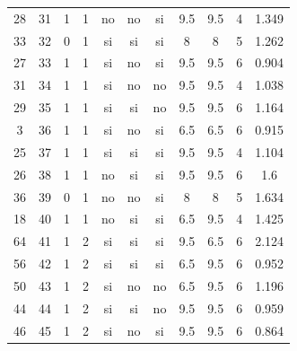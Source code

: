 \documentclass[12pt,a4paper,twoside,openright,titlepage,final]{article}
\begin{document}
\begin{appendices}
\begin{landscape}
\begin{center}
\begin{longtable}{@{\extracolsep{\fill}}*{11}{c}}
							28       & 31           & 1         & 1       & no   & no        & si           & 9.5        & 9.5           & 4             & 1.349  \\
							33       & 32           & 0         & 1       & si   & si        & si           & 8          & 8             & 5             & 1.262  \\
							27       & 33           & 1         & 1       & si   & no        & si           & 9.5        & 9.5           & 6             & 0.904  \\
							31       & 34           & 1         & 1       & si   & no        & no           & 9.5        & 9.5           & 4             & 1.038  \\
							29       & 35           & 1         & 1       & si   & si        & no           & 9.5        & 9.5           & 6             & 1.164  \\
							3        & 36           & 1         & 1       & si   & no        & si           & 6.5        & 6.5           & 6             & 0.915  \\
							25       & 37           & 1         & 1       & si   & si        & si           & 9.5        & 9.5           & 4             & 1.104  \\
							26       & 38           & 1         & 1       & no   & si        & si           & 9.5        & 9.5           & 6             & 1.6    \\
							36       & 39           & 0         & 1       & no   & no        & si           & 8          & 8             & 5             & 1.634  \\
							18       & 40           & 1         & 1       & no   & si        & si           & 6.5        & 9.5           & 4             & 1.425  \\
							64       & 41           & 1         & 2       & si   & si        & si           & 9.5        & 6.5           & 6             & 2.124  \\
							56       & 42           & 1         & 2       & si   & si        & si           & 6.5        & 9.5           & 6             & 0.952  \\
							50       & 43           & 1         & 2       & si   & no        & no           & 6.5        & 9.5           & 6             & 1.196  \\
							44       & 44           & 1         & 2       & si   & si        & no           & 9.5        & 9.5           & 6             & 0.959  \\
							46       & 45           & 1         & 2       & si   & no        & si           & 9.5        & 9.5           & 6             & 0.864  \\

\end{longtable}
\end{center}
\end{landscape}
\end{appendices}
\end{document}
